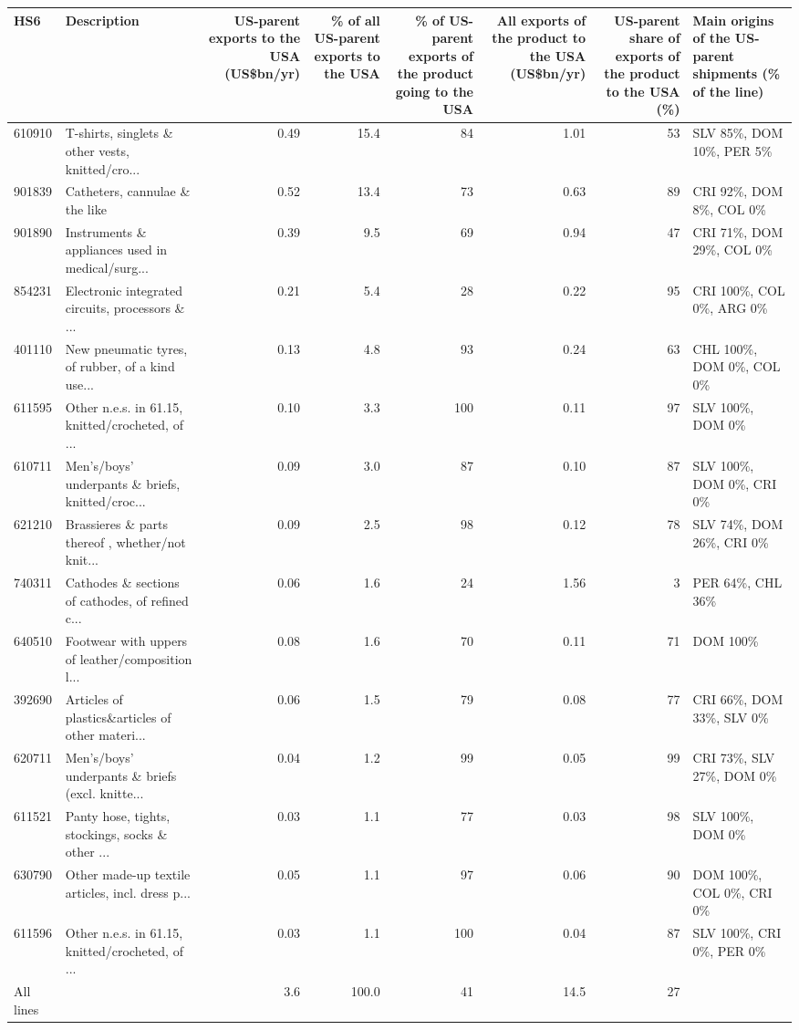 \begin{tabular}{llrrrrrl}
\toprule
HS6 & Description & \multicolumn{1}{p{1.7cm}}{\raggedright US-parent exports to the USA (US\$bn/yr)} & \multicolumn{1}{p{1.7cm}}{\raggedright \% of all US-parent exports to the USA} & \multicolumn{1}{p{2.0cm}}{\raggedright \% of US-parent exports of the product going to the USA} & \multicolumn{1}{p{1.9cm}}{\raggedright All exports of the product to the USA (US\$bn/yr)} & \multicolumn{1}{p{2.2cm}}{\raggedright US-parent share of exports of the product to the USA (\%)} & \multicolumn{1}{p{2.6cm}}{\raggedright Main origins of the US-parent shipments (\% of the line)} \\
\midrule
610910 & T-shirts, singlets \& other vests, knitted/cro... & 0.49 & 15.4 & 84 & 1.01 & 53 & SLV 85\%, DOM 10\%, PER 5\% \\
901839 & Catheters, cannulae \& the like & 0.52 & 13.4 & 73 & 0.63 & 89 & CRI 92\%, DOM 8\%, COL 0\% \\
901890 & Instruments \& appliances used in medical/surg... & 0.39 & 9.5 & 69 & 0.94 & 47 & CRI 71\%, DOM 29\%, COL 0\% \\
854231 & Electronic integrated circuits, processors \& ... & 0.21 & 5.4 & 28 & 0.22 & 95 & CRI 100\%, COL 0\%, ARG 0\% \\
401110 & New pneumatic tyres, of rubber, of a kind use... & 0.13 & 4.8 & 93 & 0.24 & 63 & CHL 100\%, DOM 0\%, COL 0\% \\
611595 & Other n.e.s. in 61.15, knitted/crocheted, of ... & 0.10 & 3.3 & 100 & 0.11 & 97 & SLV 100\%, DOM 0\% \\
610711 & Men's/boys' underpants \& briefs, knitted/croc... & 0.09 & 3.0 & 87 & 0.10 & 87 & SLV 100\%, DOM 0\%, CRI 0\% \\
621210 & Brassieres \& parts thereof , whether/not knit... & 0.09 & 2.5 & 98 & 0.12 & 78 & SLV 74\%, DOM 26\%, CRI 0\% \\
740311 & Cathodes \& sections of cathodes, of refined c... & 0.06 & 1.6 & 24 & 1.56 & 3 & PER 64\%, CHL 36\% \\
640510 & Footwear with uppers of leather/composition l... & 0.08 & 1.6 & 70 & 0.11 & 71 & DOM 100\% \\
392690 & Articles of plastics\&articles of other materi... & 0.06 & 1.5 & 79 & 0.08 & 77 & CRI 66\%, DOM 33\%, SLV 0\% \\
620711 & Men's/boys' underpants \& briefs (excl. knitte... & 0.04 & 1.2 & 99 & 0.05 & 99 & CRI 73\%, SLV 27\%, DOM 0\% \\
611521 & Panty hose, tights, stockings, socks \& other ... & 0.03 & 1.1 & 77 & 0.03 & 98 & SLV 100\%, DOM 0\% \\
630790 & Other made-up textile articles, incl. dress p... & 0.05 & 1.1 & 97 & 0.06 & 90 & DOM 100\%, COL 0\%, CRI 0\% \\
611596 & Other n.e.s. in 61.15, knitted/crocheted, of ... & 0.03 & 1.1 & 100 & 0.04 & 87 & SLV 100\%, CRI 0\%, PER 0\% \\
\midrule
All lines & & 3.6 & 100.0 & 41 & 14.5 & 27 & \\
\bottomrule
\end{tabular}
